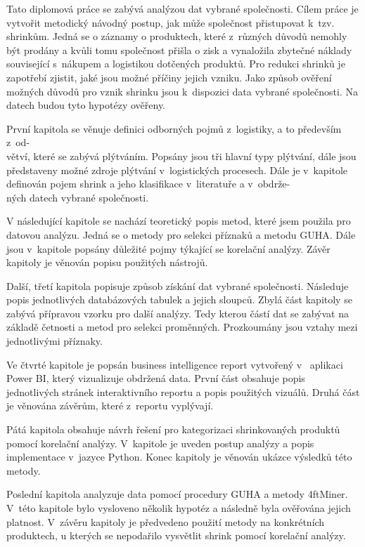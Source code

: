 Tato diplomová práce se zabývá analýzou dat vybrané společnosti. Cílem práce je vytvořit metodický návodný postup, jak může společnost přistupovat k~tzv. shrinkům.
Jedná se o záznamy o produktech, které z~různých důvodů nemohly být prodány a kvůli tomu společnost přišla o zisk a vynaložila zbytečné náklady související s~nákupem a logistikou dotčených produktů. 
Pro redukci shrinků je zapotřebí zjistit, jaké jsou možné příčiny jejich vzniku.
Jako způsob ověření možných důvodů pro vznik shrinku jsou k~dispozici data vybrané společnosti. Na datech budou tyto hypotézy ověřeny. 


První kapitola se věnuje definici odborných pojmů z~logistiky, a to především z~od-\\větví, které se zabývá plýtváním. Popsány jsou tři hlavní typy plýtvání, dále jsou představeny možné zdroje plýtvání v~logistických procesech. Dále je v~kapitole definován pojem shrink a jeho klasifikace v~literatuře a v~obdrže-\\ných datech vybrané společnosti.


V následující kapitole se nachází teoretický popis metod, které jsem použila pro datovou analýzu. Jedná se o metody pro selekci příznaků a metodu GUHA. Dále jsou v~kapitole popsány důležité pojmy týkající se korelační analýzy. Závěr kapitoly je věnován popisu použitých nástrojů.

Další, třetí kapitola popisuje způsob získání dat vybrané společnosti. Následuje popis jednotlivých databázových tabulek a jejich sloupců. Zbylá část kapitoly se zabývá přípravou vzorku pro další analýzy. Tedy kterou částí dat se zabývat na základě četnosti a metod pro selekci proměnných. Prozkoumány jsou vztahy mezi jednotlivými příznaky.

Ve čtvrté kapitole je popsán business intelligence report vytvořený v~ aplikaci Power BI, který vizualizuje obdržená data. První část obsahuje popis jednotlivých stránek interaktivního reportu a popis použitých vizuálů. Druhá část je věnována závěrům, které z~reportu vyplývají.

Pátá kapitola obsahuje návrh řešení pro kategorizaci shrinkovaných produktů pomocí korelační analýzy. V~kapitole je uveden postup analýzy a popis implementace v~jazyce Python. Konec kapitoly je věnován ukázce výsledků této metody.

Poslední kapitola analyzuje data pomocí procedury GUHA a metody 4ftMiner. V~této kapitole bylo vysloveno několik hypotéz a následně byla ověřována jejich platnost. V~závěru kapitoly je předvedeno použití metody na konkrétních produktech, u kterých se nepodařilo vysvětlit shrink pomocí korelační analýzy.




